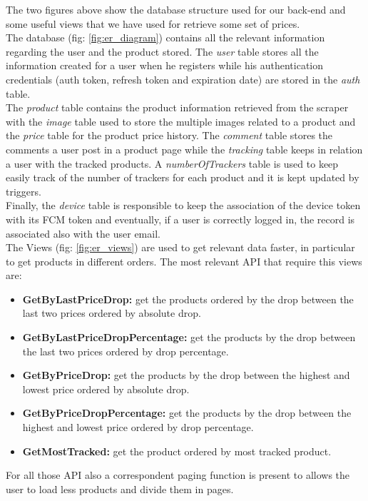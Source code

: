 The two figures above show the database structure used for our back-end and some useful views that we have used for retrieve some set of prices.\\
The database (fig: \ref{fig:er_diagram}) contains all the relevant information regarding the user and the product stored.
The \textit{user} table stores all the information created for a user when he registers while his authentication credentials (auth token, refresh token and expiration date) are stored in the \textit{auth} table.\\
The \textit{product} table contains the product information retrieved from the scraper with the \textit{image} table used to store the multiple images related to a product and the \textit{price} table for the product price history. The \textit{comment} table stores the comments a user post in a product page while the \textit{tracking} table keeps in relation a user with the tracked products. A \textit{numberOfTrackers} table is used to keep easily track of the number of trackers for each product and it is kept updated by triggers.\\
Finally, the \textit{device} table is responsible to keep the association of the device token with its FCM token and eventually, if a user is correctly logged in, the record is associated also with the user email.\\


The Views (fig: \ref{fig:er_views}) are used to get relevant data faster, in particular to get products in different orders. The most relevant API that require this views are: 
\begin{itemize}
    \item \textbf{GetByLastPriceDrop:} get the products ordered by the drop between the last two prices ordered by absolute drop.
    \item \textbf{GetByLastPriceDropPercentage:} get the products by the drop between the last two prices ordered by drop percentage.
    \item \textbf{GetByPriceDrop:} get the products by the drop between the highest and lowest price ordered by absolute drop.
    \item \textbf{GetByPriceDropPercentage:} get the products by the drop between the highest and lowest price ordered by drop percentage.
    \item \textbf{GetMostTracked:} get the product ordered by most tracked product.
\end{itemize}
For all those API also a correspondent paging function is present to allows the user to load less products and divide them in pages.

